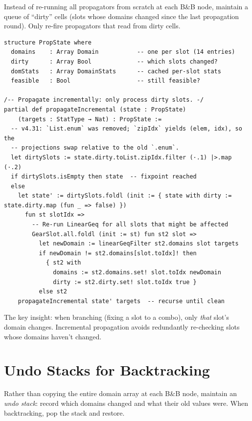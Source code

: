 \documentclass[11pt, a4paper, oneside]{book}
\begin{document}
Instead of re-running all propagators from scratch at each B\&B node,
maintain a queue of ``dirty'' cells (slots whose domains changed since
the last propagation round).  Only re-fire propagators that read from
dirty cells.

\begin{leanbox}[title={Lean 4 --- Incremental Propagation Queue}]
\begin{verbatim}
structure PropState where
  domains    : Array Domain           -- one per slot (14 entries)
  dirty      : Array Bool             -- which slots changed?
  domStats   : Array DomainStats      -- cached per-slot stats
  feasible   : Bool                   -- still feasible?

/-- Propagate incrementally: only process dirty slots. -/
partial def propagateIncremental (state : PropState)
    (targets : StatType → Nat) : PropState :=
  -- v4.31: `List.enum` was removed; `zipIdx` yields (elem, idx), so the
  -- projections swap relative to the old `.enum`.
  let dirtySlots := state.dirty.toList.zipIdx.filter (·.1) |>.map (·.2)
  if dirtySlots.isEmpty then state  -- fixpoint reached
  else
    let state' := dirtySlots.foldl (init := { state with dirty := state.dirty.map (fun _ => false) })
      fun st slotIdx =>
        -- Re-run LinearGeq for all slots that might be affected
        GearSlot.all.foldl (init := st) fun st2 slot =>
          let newDomain := linearGeqFilter st2.domains slot targets
          if newDomain != st2.domains[slot.toIdx]! then
            { st2 with
              domains := st2.domains.set! slot.toIdx newDomain
              dirty := st2.dirty.set! slot.toIdx true }
          else st2
    propagateIncremental state' targets  -- recurse until clean
\end{verbatim}
\end{leanbox}

The key insight: when branching (fixing a slot to a combo), only \emph{that}
slot's domain changes.  Incremental propagation avoids redundantly re-checking
slots whose domains haven't changed.

\section{Undo Stacks for Backtracking}

Rather than copying the entire domain array at each B\&B node, maintain an
\emph{undo stack}: record which domains changed and what their old values were.
When backtracking, pop the stack and restore.
\end{document}
